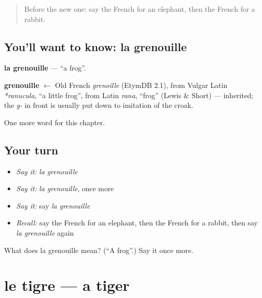 \label{lesson:FR-C88-grenouille}



\begin{quote}
Before the new one: say the French for an elephant, then the French for a rabbit.
\end{quote}

\subsection*{You'll want to know: la grenouille}
\textbf{la grenouille} — \textquotedblleft{}a frog\textquotedblright{}.

\begin{cousinweb}
\textbf{grenouille} $\leftarrow$ Old French \emph{grenoille} (EtymDB 2.1), from Vulgar Latin \emph{*ranucula}, \textquotedblleft{}a little frog\textquotedblright{}, from Latin \emph{rana}, \textquotedblleft{}frog\textquotedblright{} (Lewis \& Short) — inherited; the \emph{g-} in front is usually put down to imitation of the croak.
\end{cousinweb}

\begin{grammarlens}[title={What you've built}]
One more word for this chapter.
\end{grammarlens}

\subsection*{Your turn}
\begin{itemize}
\raggedright
  \item \emph{Say it:} \emph{la grenouille}
  \item \emph{Say it:} \emph{la grenouille}, once more
  \item \emph{Say it:} say \emph{la grenouille}
  \item \emph{Recall:} say the French for an elephant, then the French for a rabbit, then say \emph{la grenouille} again
\end{itemize}

\begin{tcolorbox}[breakable,colback=teal!4,colframe=teal!35!black,title={Before you move on}]
What does la grenouille mean? (\textquotedblleft{}A frog\textquotedblright{}.) Say it once more.
\end{tcolorbox}
\section[le tigre]{le tigre — a tiger}

